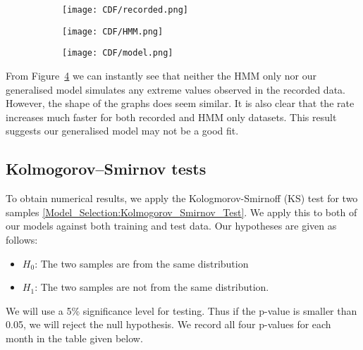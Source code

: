     \begin{figure}
        \begin{subfigure}{.3\textwidth}
          \centering
          \texttt{[image: CDF/recorded.png]}
          \caption{}
          \label{CDF:data}
        \end{subfigure}
        \begin{subfigure}{.3\textwidth}
          \centering
          \texttt{[image: CDF/HMM.png]}
          \caption{}
          \label{CDF:simhmm}
        \end{subfigure}
        \begin{subfigure}{.3\textwidth}
          \centering
          \texttt{[image: CDF/model.png]}
          \caption{}
          \label{CDF:model}
        \end{subfigure}
        \caption{}
        \label{CDF}
    \end{figure}
    
    From Figure~\ref{CDF} we can instantly see that neither the HMM only nor our generalised model simulates any extreme values observed in the recorded data. However, the shape of the graphs does seem similar. It is also clear that the rate increases much faster for both recorded and HMM only datasets. This result suggests our generalised model may not be a good fit.


    \subsection{Kolmogorov–Smirnov tests}
    \label{Results:Analysis:Kolmogorov_Smirnov_tests}

    To obtain numerical results, we apply the Kologmorov-Smirnoff (KS) test for two samples \ref{Model_Selection:Kolmogorov_Smirnov_Test}. We apply this to both of our models against both training and test data. Our hypotheses are given as follows:

    \begin{itemize}
        \item $H_0$: The two samples are from the same distribution
        \item $H_1$: The two samples are not from the same distribution.
    \end{itemize}

    We will use a 5\% significance level for testing. Thus if the p-value is smaller than 0.05, we will reject the null hypothesis. We record all four p-values for each month in the table given below.

